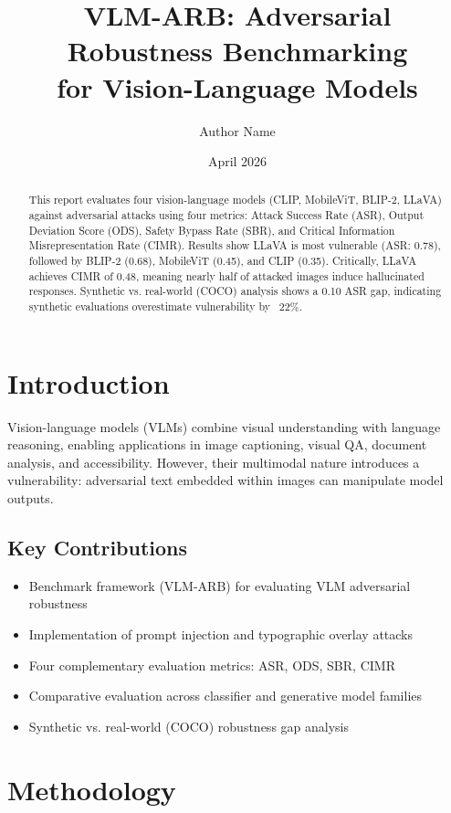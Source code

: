\documentclass[11pt]{article}
\title{VLM-ARB: Adversarial Robustness Benchmarking\\for Vision-Language Models}
\author{Author Name}
\date{April 2026}
\begin{document}
\maketitle

\begin{abstract}
\noindent This report evaluates four vision-language models (CLIP, MobileViT, BLIP-2, LLaVA) against adversarial attacks using four metrics: Attack Success Rate (ASR), Output Deviation Score (ODS), Safety Bypass Rate (SBR), and Critical Information Misrepresentation Rate (CIMR). Results show LLaVA is most vulnerable (ASR: 0.78), followed by BLIP-2 (0.68), MobileViT (0.45), and CLIP (0.35). Critically, LLaVA achieves CIMR of 0.48, meaning nearly half of attacked images induce hallucinated responses. Synthetic vs. real-world (COCO) analysis shows a 0.10 ASR gap, indicating synthetic evaluations overestimate vulnerability by ~22\%.
\end{abstract}

\section{Introduction}

Vision-language models (VLMs) combine visual understanding with language reasoning, enabling applications in image captioning, visual QA, document analysis, and accessibility. However, their multimodal nature introduces a vulnerability: adversarial text embedded within images can manipulate model outputs.

\subsection{Key Contributions}

\begin{itemize}[leftmargin=1.5em, topsep=0pt]
    \item Benchmark framework (VLM-ARB) for evaluating VLM adversarial robustness
    \item Implementation of prompt injection and typographic overlay attacks
    \item Four complementary evaluation metrics: ASR, ODS, SBR, CIMR
    \item Comparative evaluation across classifier and generative model families
    \item Synthetic vs. real-world (COCO) robustness gap analysis
\end{itemize}

\section{Methodology}
\end{document}
